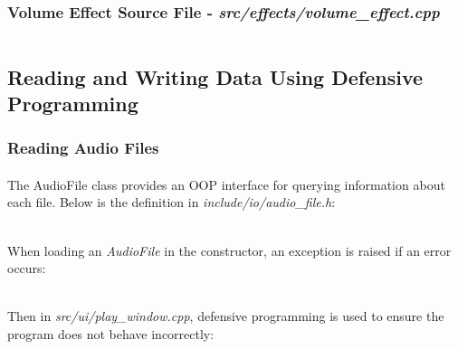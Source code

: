 \subsubsection{Volume Effect Source File - \textit{src/effects/volume\_effect.cpp}}
\inputminted[linenos]{c++}{../src/effects/volume_effect.cpp}


\pagebreak
\subsection{Reading and Writing Data Using Defensive Programming}

\subsubsection{Reading Audio Files}
\paragraph{}
The AudioFile class provides an OOP interface for querying information about each file. Below is the definition in \textit{include/io/audio\_file.h}:
\inputminted[linenos]{c++}{../include/io/audio_file.h}

\paragraph{}
When loading an \textit{AudioFile} in the constructor, an exception is raised if an error occurs:
\inputminted[linenos, firstline=4, lastline=10]{c++}{../src/io/audio_file.cpp}

\paragraph{}
Then in \textit{src/ui/play\_window.cpp},  defensive programming is used to ensure the program does not behave incorrectly:
\pagebreak
\inputminted[linenos, firstline=303, lastline=348]{c++}{../src/ui/play_window.cpp}